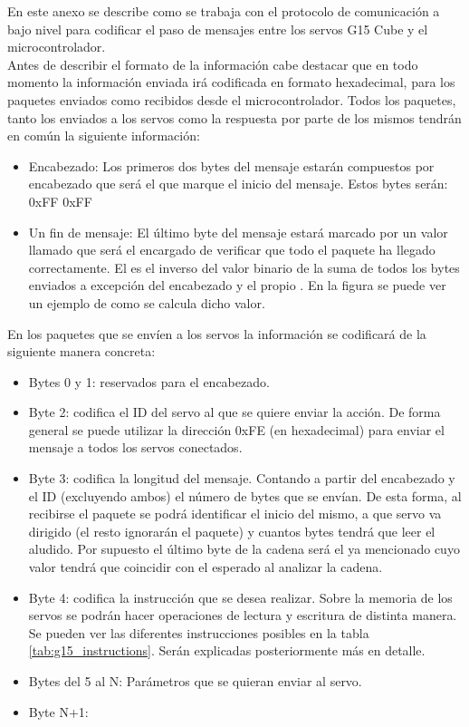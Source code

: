     
    En este anexo se describe como se trabaja con el protocolo de comunicación a bajo nivel para codificar el paso de mensajes entre los servos G15 Cube y el microcontrolador.
    \\

    Antes de describir el formato de la información cabe destacar que en todo momento la información enviada irá codificada en formato hexadecimal, para los paquetes enviados como recibidos desde el microcontrolador. Todos los paquetes, tanto los enviados a los servos como la respuesta por parte de los mismos tendrán en común la siguiente información:

    \begin{itemize}
    	\item Encabezado: Los primeros dos bytes del mensaje estarán compuestos por encabezado que será el que marque el inicio del mensaje. Estos bytes serán: 0xFF 0xFF
    	\item Un fin de mensaje: El último byte del mensaje estará marcado por un valor llamado  que será el encargado de verificar que todo el paquete ha llegado correctamente. El  es el inverso del valor binario de la suma de todos los bytes enviados a excepción del encabezado y el propio . En la figura \completar se puede ver un ejemplo de como se calcula dicho valor.
    \end{itemize}


    En los paquetes que se envíen a los servos la información se codificará de la siguiente manera concreta:

    \begin{itemize}
    	\item Bytes 0 y 1: reservados para el encabezado.
    	\item Byte 2: codifica el ID del servo al que se quiere enviar la acción. De forma general se puede utilizar la dirección 0xFE (en hexadecimal) para enviar el mensaje a todos los servos conectados.
    	\item Byte 3: codifica la longitud del mensaje. Contando a partir del encabezado y el ID (excluyendo ambos) el número de bytes que se envían. De esta forma, al recibirse el paquete se podrá identificar el inicio del mismo, a que servo va dirigido (el resto ignorarán el paquete) y cuantos bytes tendrá que leer el aludido. Por supuesto el último byte de la cadena será el ya mencionado  cuyo valor tendrá que coincidir con el esperado al analizar la cadena.
    	\item Byte 4: codifica la instrucción que se desea realizar. Sobre la memoria de los servos se podrán hacer operaciones de lectura y escritura de distinta manera. Se pueden ver las diferentes instrucciones posibles en la tabla \ref{tab:g15_instructions}. Serán explicadas posteriormente más en detalle.
    	\item Bytes del 5 al N: Parámetros que se quieran enviar al servo.
    	\item Byte N+1: 
    \end{itemize}

